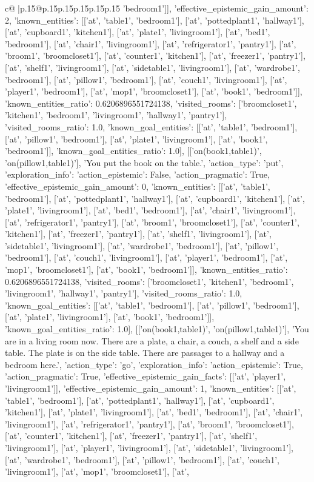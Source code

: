 \documentclass{article}
\begin{document}
{\begin{supertabular}{c@{$\;$}|p{.15\linewidth}@{}p{.15\linewidth}p{.15\linewidth}p{.15\linewidth}p{.15\linewidth}p{.15\linewidth}}
{{{'bedroom1']], 'effective_epistemic_gain_amount': 2, 'known_entities': [['at', 'table1', 'bedroom1'], ['at', 'pottedplant1', 'hallway1'], ['at', 'cupboard1', 'kitchen1'], ['at', 'plate1', 'livingroom1'], ['at', 'bed1', 'bedroom1'], ['at', 'chair1', 'livingroom1'], ['at', 'refrigerator1', 'pantry1'], ['at', 'broom1', 'broomcloset1'], ['at', 'counter1', 'kitchen1'], ['at', 'freezer1', 'pantry1'], ['at', 'shelf1', 'livingroom1'], ['at', 'sidetable1', 'livingroom1'], ['at', 'wardrobe1', 'bedroom1'], ['at', 'pillow1', 'bedroom1'], ['at', 'couch1', 'livingroom1'], ['at', 'player1', 'bedroom1'], ['at', 'mop1', 'broomcloset1'], ['at', 'book1', 'bedroom1']], 'known_entities_ratio': 0.6206896551724138, 'visited_rooms': ['broomcloset1', 'kitchen1', 'bedroom1', 'livingroom1', 'hallway1', 'pantry1'], 'visited_rooms_ratio': 1.0, 'known_goal_entities': [['at', 'table1', 'bedroom1'], ['at', 'pillow1', 'bedroom1'], ['at', 'plate1', 'livingroom1'], ['at', 'book1', 'bedroom1']], 'known_goal_entities_ratio': 1.0}}], [['on(book1,table1)', 'on(pillow1,table1)'], 'You put the book on the table.', {'action_type': 'put', 'exploration_info': {'action_epistemic': False, 'action_pragmatic': True, 'effective_epistemic_gain_amount': 0, 'known_entities': [['at', 'table1', 'bedroom1'], ['at', 'pottedplant1', 'hallway1'], ['at', 'cupboard1', 'kitchen1'], ['at', 'plate1', 'livingroom1'], ['at', 'bed1', 'bedroom1'], ['at', 'chair1', 'livingroom1'], ['at', 'refrigerator1', 'pantry1'], ['at', 'broom1', 'broomcloset1'], ['at', 'counter1', 'kitchen1'], ['at', 'freezer1', 'pantry1'], ['at', 'shelf1', 'livingroom1'], ['at', 'sidetable1', 'livingroom1'], ['at', 'wardrobe1', 'bedroom1'], ['at', 'pillow1', 'bedroom1'], ['at', 'couch1', 'livingroom1'], ['at', 'player1', 'bedroom1'], ['at', 'mop1', 'broomcloset1'], ['at', 'book1', 'bedroom1']], 'known_entities_ratio': 0.6206896551724138, 'visited_rooms': ['broomcloset1', 'kitchen1', 'bedroom1', 'livingroom1', 'hallway1', 'pantry1'], 'visited_rooms_ratio': 1.0, 'known_goal_entities': [['at', 'table1', 'bedroom1'], ['at', 'pillow1', 'bedroom1'], ['at', 'plate1', 'livingroom1'], ['at', 'book1', 'bedroom1']], 'known_goal_entities_ratio': 1.0}}], [['on(book1,table1)', 'on(pillow1,table1)'], 'You are in a living room now. There are a plate, a chair, a couch, a shelf and a side table. The plate is on the side table. There are passages to a hallway and a bedroom here.', {'action_type': 'go', 'exploration_info': {'action_epistemic': True, 'action_pragmatic': True, 'effective_epistemic_gain_facts': [['at', 'player1', 'livingroom1']], 'effective_epistemic_gain_amount': 1, 'known_entities': [['at', 'table1', 'bedroom1'], ['at', 'pottedplant1', 'hallway1'], ['at', 'cupboard1', 'kitchen1'], ['at', 'plate1', 'livingroom1'], ['at', 'bed1', 'bedroom1'], ['at', 'chair1', 'livingroom1'], ['at', 'refrigerator1', 'pantry1'], ['at', 'broom1', 'broomcloset1'], ['at', 'counter1', 'kitchen1'], ['at', 'freezer1', 'pantry1'], ['at', 'shelf1', 'livingroom1'], ['at', 'player1', 'livingroom1'], ['at', 'sidetable1', 'livingroom1'], ['at', 'wardrobe1', 'bedroom1'], ['at', 'pillow1', 'bedroom1'], ['at', 'couch1', 'livingroom1'], ['at', 'mop1', 'broomcloset1'], ['at', }}}
\end{supertabular}}
\end{document}
